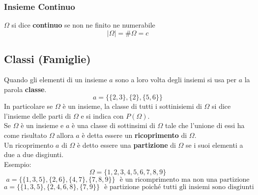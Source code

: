 \subsubsection{Insieme Continuo}
$\Omega$ si dice \textbf{continuo} se non ne finito ne numerabile
$$ |\Omega| = \#\Omega = c $$

\subsection{Classi (Famiglie)}
Quando gli elementi di un insieme $a$ sono a loro volta degli insiemi si usa per $a$ la parola \textbf{classe}.
$$ a = \{ \{2,3\},\{2\},\{5,6\} \}$$
In particolare se $\Omega$ è un insieme, la classe di tutti i sottinisiemi di $\Omega$ si dice l'insieme delle parti di $\Omega$ e si indica con $P(\Omega)$.\\
Se $\Omega$ è un insieme e $a$ è una classe di sottinsimi di $\Omega$ tale che l'unione di essi ha come risultato $\Omega$ allora $a$ è detta essere un \textbf{ricoprimento} di $\Omega$.\\
Un ricoprimento $a$ di $\Omega$ è detto essere una \textbf{partizione} di $\Omega$ se i suoi elementi a due a due disgiunti.\\
Esempio:
 $$ \Omega= \{1,2,3,4,5,6,7,8,9\} $$
 $$ a = \{ \{1,3,5\},\{2,6\},\{4,7\},\{7,8,9\} \} \:\:\: \text{è un ricomprimento ma non una partizione}$$
 $$ a = \{ \{1,3,5\},\{2,4,6,8\},\{7,9\} \} \:\:\: \text{è partizione poiché  tutti gli insiemi sono disgiunti}$$
